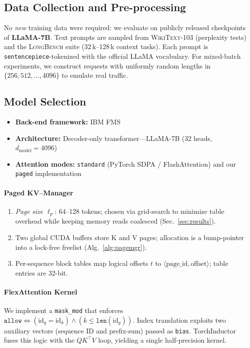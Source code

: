 \documentclass[conference]{IEEEtran}
\begin{document}
\subsection{Data Collection and Pre-processing}\label{subsec:data}
No \emph{new} training data were required: we evaluate on publicly released checkpoints of \textbf{LLaMA-7B}.  
Text prompts are sampled from \textsc{WikiText-103} (perplexity tests) and the \textsc{LongBench} suite (32\,k–128\,k context tasks).  
Each prompt is \texttt{sentencepiece}-tokenized with the official LLaMA vocabulary.  
For mixed-batch experiments, we construct requests with uniformly random lengths in \(\{256,512,\dots,4096\}\) to emulate real traffic.

\vspace{-0.4em}
\subsection{Model Selection}\label{subsec:model}
\begin{itemize}[leftmargin=*]
  \item \textbf{Back-end framework:} IBM FMS
  \item \textbf{Architecture:} Decoder-only transformer—LLaMA-7B
        (32 heads, $d_{\text{model}} = 4096$)
  \item \textbf{Attention modes:} \texttt{standard}
        (PyTorch SDPA / FlashAttention) and our \texttt{paged} implementation
\end{itemize}

\paragraph*{Paged KV–Manager}
\begin{enumerate}[leftmargin=*]
    \item \emph{Page size \(\ell_p\)}: 64–128 tokens; chosen via grid-search to minimize table overhead while keeping memory reads coalesced (Sec.~\ref{sec:results}).
    \item Two global CUDA buffers store K and V pages; allocation is a bump-pointer into a lock-free freelist (Alg.~\ref{alg:pagemgr}).
    \item Per-sequence block tables map logical offsets $t$ to $\langle\text{page\_id},\text{offset}\rangle$; table entries are 32-bit.
\end{enumerate}

\paragraph*{FlexAttention Kernel}
We implement a \verb|mask_mod| that enforces
\(\texttt{allow} \iff (\text{id}_q = \text{id}_k) \wedge (k \le \texttt{len}(\text{id}_q))\).
Index translation exploits two auxiliary vectors (sequence ID and prefix-sum) passed as \texttt{bias}.  
TorchInductor fuses this logic with the $QK^{\top}V$ loop, yielding a single half-precision kernel.
\end{document}
